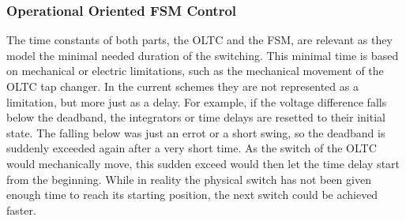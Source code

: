 
\subsubsection{Operational Oriented FSM Control}
\label{sec:modeling-op-control}


The time constants of both parts, the \acs{OLTC} and the \acs{FSM}, are relevant as they model the minimal needed duration of the switching.
This minimal time is based on mechanical or electric limitations, such as the mechanical movement of the \acs{OLTC} tap changer.
In the current schemes they are not represented as a limitation, but more just as a delay.
For example, if the voltage difference falls below the deadband, the integrators or time delays are resetted to their initial state. 
The falling below was just an errot or a short swing, so the deadband is suddenly exceeded again after a very short time.
As the switch of the \acs{OLTC} would mechanically move, this sudden exceed would then let the time delay start from the beginning.
While in reality the physical switch has not been given enough time to reach its starting position, the next switch could be achieved faster. 

